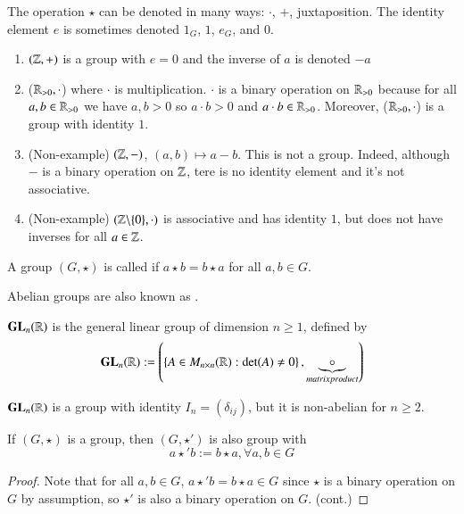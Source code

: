 \begin{rmk}
    The operation $\star$ can be denoted in many ways: $\cdot$, $+$, juxtaposition. The identity element $e$ is sometimes denoted $1_G$, $1$, $e_G$, and $0$.
\end{rmk}

\begin{eg}
    \leavevmode
    \begin{enumerate}
        \item $(\mathbb Z,+)$ is a group with $e = 0$ and the inverse of $a$ is denoted $-a$
        \item ($\mathbb R_{>0},\cdot$) where $\cdot$ is multiplication. $\cdot$ is a binary operation on $\mathbb R_{>0}$ because for all $a,b \in \mathbb R_{>0}$ we have $a,b >0$ so $a\cdot b > 0$ and $a \cdot b \in \mathbb R_{>0}$. Moreover, ($\mathbb R_{>0},\cdot$) is a group with identity $1$.
        \item (Non-example) $(\mathbb Z,-)$, $(a,b)\mapsto a-b$. This is not a group. Indeed, although $-$ is a binary operation on $\mathbb Z$, tere is no identity element and it's not associative.
        \item (Non-example) $(\mathbb Z\backslash \{0\},\cdot)$ is associative and has identity $1$, but does not have inverses for all $a \in \mathbb Z$.
    \end{enumerate}
\end{eg}

\begin{defn}
    A group $(G,\star)$ is called  if $a \star b = b \star a$ for all $a, b \in G$.
    \begin{rmk}
        Abelian groups are also known as .
    \end{rmk}
\end{defn}


\begin{eg}
    $\mathbf{GL}_n(\mathbb R)$ is the general linear group of dimension $n \geq 1$, defined by \begin{equation}
        \mathbf{GL}_n(\mathbb R) := \left(\left\{ A \in M_{n\times n}(\mathbb R): \det(A) \neq 0\right\},\underbrace{\circ}_{matrix product}\right)
    \end{equation}
    \begin{xca}
        $\mathbf{GL}_n(\mathbb R)$ is a group with identity $I_n = (\delta_{ij})$, but it is non-abelian for $n \geq 2$.
    \end{xca}
\end{eg}

\begin{xca}
    If $(G,\star)$ is a group, then $(G,\star')$ is also group with $$a \star' b := b\star a, \forall a,b \in G$$
    \begin{proof}
        Note that for all $a,b \in G$, $a \star' b = b \star a \in G$ since $\star$ is a binary operation on $G$ by assumption, so $\star'$ is also a binary operation on $G$. (cont.)
    \end{proof}
\end{xca}


